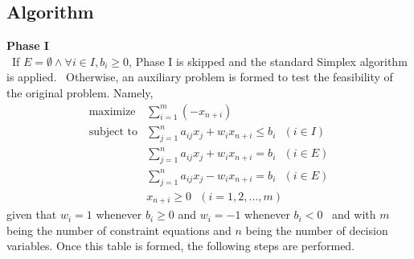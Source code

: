 \documentclass[11pt]{article}
\begin{document}
\subsection{Algorithm}
\textbf{Phase I}\\
~\indent If $E = \emptyset  \land  \forall i \in I, b_i \geq 0$, Phase I is skipped and the standard Simplex algorithm is applied.~\cite{wolfram} Otherwise, an auxiliary problem is formed to test the feasibility of the original problem. Namely,\cite{wolfram}
\begin{eqnarray*}
\mbox{maximize}& \sum\limits_{i=1}^m (-x_{n+i})\\
\mbox{subject to}& \sum\limits_{j=1}^n a_{ij}x_j + w_ix_{n+i} \leq b_i\mbox{\ \ }(i \in I)\\
 & \sum\limits_{j=1}^n a_{ij}x_j + w_ix_{n+i} = b_i\mbox{\ \ }(i \in E)\\
 & \sum\limits_{j=1}^n a_{ij}x_j - w_ix_{n+i} = b_i\mbox{\ \ }(i \in E)\\
 & x_{n+i} \geq 0\mbox{\ \ }(i = 1, 2,...,m)
\end{eqnarray*}
given that $w_i = 1$ whenever $b_i \geq 0$ and $w_i = -1$ whenever $b_i < 0$~\cite{chvatal83} and with $m$ being the number of constraint equations and $n$ being the number of decision variables. Once this table is formed, the following steps are performed.
\end{document}
